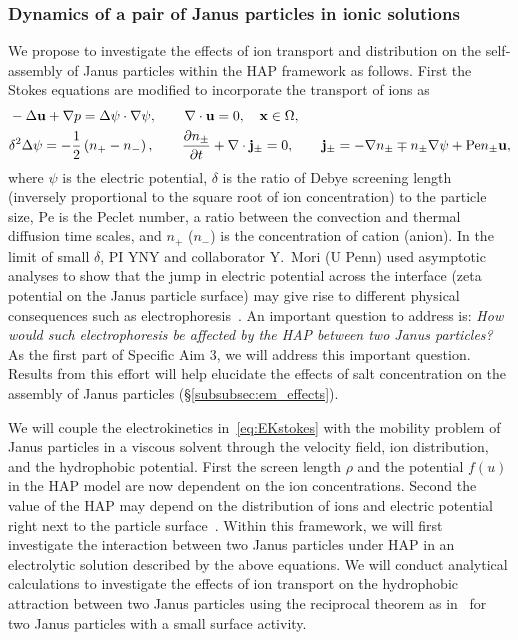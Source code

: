 \subsubsection{Dynamics of a pair of Janus particles in ionic
solutions\label{subsubsec:JP_electrolyte}}
We propose to investigate the effects of ion transport and distribution
on the self-assembly of Janus particles within the HAP framework as
follows. First the Stokes equations are modified to incorporate the
transport of ions as
\begin{equation}
\label{eq:EKstokes}
\begin{aligned}
  &-\Delta \mathbf{u} + \nabla p = \Delta\psi\cdot\nabla\psi, \qquad
  \nabla \cdot \mathbf{u} = 0,  \quad \mathbf{x} \in \Omega,\\
  &\delta^2\Delta\psi = -\frac{1}{2}\left(n_+-n_-\right),\qquad
  \frac{\partial n_{\pm}}{\partial t} + \nabla\cdot{\bf j}_{\pm} = 0,\qquad {\bf j}_{\pm} = -\nabla n_{\pm} \mp n_{\pm} \nabla\psi + \mbox{Pe} n_{\pm}\mathbf{u},
\end{aligned}
\end{equation}
where $\psi$ is the electric potential, $\delta$ is the ratio of Debye
screening length (inversely proportional to the square root of ion
concentration) to the particle size, $\mbox{Pe}$ is the Peclet number, a
ratio between the convection and thermal diffusion time scales, and
$n_{+}$ ($n_{-}$) is the concentration of cation (anion). In the limit
of small $\delta$, PI YNY and collaborator Y.~Mori (U Penn) used
asymptotic analyses to show that the jump in electric potential across
the interface (zeta potential on the Janus particle surface) may give
rise to different physical consequences such as
electrophoresis~\cite{Mori2018_JFM}.
%
An important question to address is: {\it How would such electrophoresis
be affected by the HAP between two Janus particles?} As the first part
of Specific Aim 3, we will address this important question. Results from
this effort will help elucidate the effects of salt concentration on the
assembly of Janus particles (\S\ref{subsubsec:em_effects}).

We will couple the electrokinetics in~\eqref{eq:EKstokes} with the
mobility problem of Janus particles in a viscous solvent through the
velocity field, ion distribution, and the hydrophobic potential. First
the screen length $\rho$ and the potential $f(u)$ in the HAP model are now 
dependent on  the ion concentrations. 
%
Second the value of the HAP may depend on the distribution of ions and
electric potential right next to the particle
surface~\cite{Mori2018_JFM}. Within this framework, we will first
investigate the interaction between two Janus particles under HAP in an
electrolytic solution described by the above equations. We will conduct
analytical calculations to investigate the effects of ion transport on
the hydrophobic attraction between two Janus particles using the
reciprocal theorem as in~\cite{BayatiNajafi2016_JCP} for two Janus
particles with a small surface activity.


